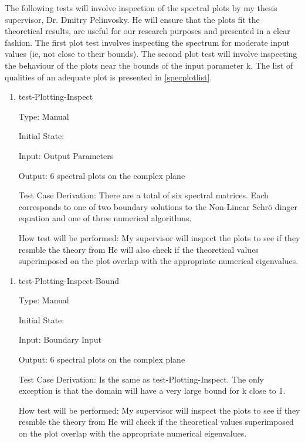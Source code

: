 \documentclass[12pt, titlepage]{article}
\begin{document}
The following tests will involve inspection of the spectral plots by my thesis 
supervisor, Dr. Dmitry Pelinvosky. He will ensure that the plots fit the 
theoretical results, are useful for our research purposes and presented in a 
clear fashion. The first plot test involves inspecting the spectrum for 
moderate input values (ie, not close to their bounds). The second plot test 
will involve inspecting the behaviour of the plots near the bounds of the input 
parameter k. The list of qualities of an adequate plot is presented in 
\ref{specplotlist}. 

\begin{enumerate}				
	\item{test-Plotting-Inspect\\}
	
	Type: Manual
	
	Initial State: 
	
	Input: Output Parameters
	
	Output: 6 spectral plots on the complex plane
	
	Test Case Derivation: There are a total of six spectral matrices. Each 
	corresponds to one of two boundary solutions to the Non-Linear Schr\"{o} 
	dinger equation and one of three numerical algorithms. 
	
	How test will be performed: My supervisor will inspect the plots to see if 
	they resmble the theory from \cite{SegaletAl} He will also check if the 
	theoretical 
	values superimposed on the plot overlap with the appropriate numerical 
	eigenvalues.  

\end{enumerate} 

\begin{enumerate}				
	\item{test-Plotting-Inspect-Bound\\}
	
	Type: Manual
	
	Initial State: 
	
	Input: Boundary Input
	
	Output: 6 spectral plots on the complex plane
	
	Test Case Derivation: Is the same as test-Plotting-Inspect. The only 
	exception is that the domain will have a very large bound for k close to 1.
	
	How test will be performed: My supervisor will inspect the plots to see if 
	they resmble the theory from \cite{SegaletAl} He will check if the 
	theoretical 
	values superimposed on the plot overlap with the appropriate numerical 
	eigenvalues. 
\end{enumerate}
\end{document}
